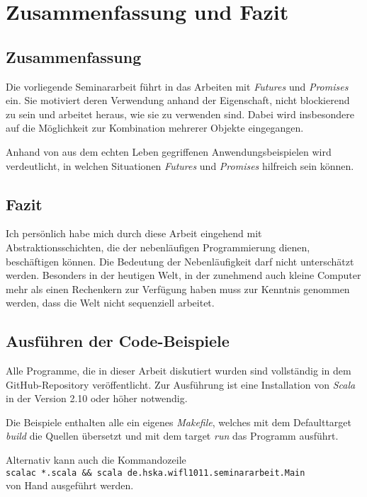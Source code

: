 \section{Zusammenfassung und Fazit}

\subsection{Zusammenfassung}

Die vorliegende Seminararbeit führt in das Arbeiten mit \emph{Futures}
und \emph{Promises} ein. Sie motiviert deren Verwendung anhand der
Eigenschaft, nicht blockierend zu sein und arbeitet heraus, wie sie
zu verwenden sind. Dabei wird insbesondere auf die Möglichkeit
zur Kombination mehrerer Objekte eingegangen.

Anhand von aus dem echten Leben gegriffenen Anwendungsbeispielen wird
verdeutlicht, in welchen Situationen \emph{Futures} und \emph{Promises}
hilfreich sein können.

\subsection{Fazit}

Ich persönlich habe mich durch diese Arbeit eingehend mit 
Abstraktionsschichten, die der nebenläufigen Programmierung dienen,
beschäftigen können. Die Bedeutung der Nebenläufigkeit darf nicht
unterschätzt werden. Besonders in der heutigen Welt, in der zunehmend
auch kleine Computer mehr als einen Rechenkern zur Verfügung haben
muss zur Kenntnis genommen werden, dass die Welt nicht sequenziell
arbeitet. 

\subsection{Ausführen der Code-Beispiele}

Alle Programme, die in dieser Arbeit diskutiert wurden sind 
vollständig in dem GitHub-Repository \cite{code} veröffentlicht.
Zur Ausführung ist eine Installation von \emph{Scala} in der
Version 2.10 oder höher notwendig.

Die Beispiele enthalten alle ein eigenes \emph{Makefile}, welches
mit dem Defaulttarget \emph{build} die Quellen übersetzt und mit
dem target \emph{run} das Programm ausführt.

Alternativ kann auch die Kommandozeile \\
\texttt{scalac *.scala \&\& scala de.hska.wifl1011.seminararbeit.Main} \\
von Hand ausgeführt werden.



